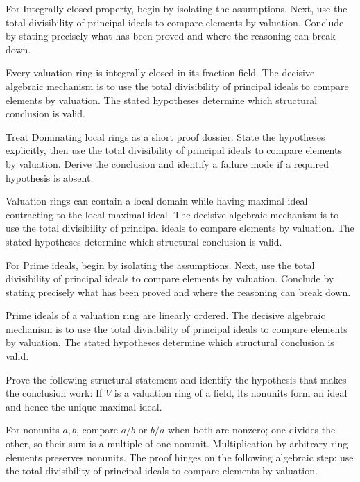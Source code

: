 \begin{problem}\label{prob:v21-problem-06}
For Integrally closed property, begin by isolating the assumptions. Next, use the total divisibility of principal ideals to compare elements by valuation. Conclude by stating precisely what has been proved and where the reasoning can break down.
\end{problem}
\begin{solution}
Every valuation ring is integrally closed in its fraction field. The decisive algebraic mechanism is to use the total divisibility of principal ideals to compare elements by valuation. The stated hypotheses determine which structural conclusion is valid.
\end{solution}

\begin{problem}\label{prob:v21-problem-07}
Treat Dominating local rings as a short proof dossier. State the hypotheses explicitly, then use the total divisibility of principal ideals to compare elements by valuation. Derive the conclusion and identify a failure mode if a required hypothesis is absent.
\end{problem}
\begin{solution}
Valuation rings can contain a local domain while having maximal ideal contracting to the local maximal ideal. The decisive algebraic mechanism is to use the total divisibility of principal ideals to compare elements by valuation. The stated hypotheses determine which structural conclusion is valid.
\end{solution}

\begin{problem}\label{prob:v21-problem-08}
For Prime ideals, begin by isolating the assumptions. Next, use the total divisibility of principal ideals to compare elements by valuation. Conclude by stating precisely what has been proved and where the reasoning can break down.
\end{problem}
\begin{solution}
Prime ideals of a valuation ring are linearly ordered. The decisive algebraic mechanism is to use the total divisibility of principal ideals to compare elements by valuation. The stated hypotheses determine which structural conclusion is valid.
\end{solution}

\begin{problem}\label{prob:v21-problem-09}
Prove the following structural statement and identify the hypothesis that makes the conclusion work: If $V$ is a valuation ring of a field, its nonunits form an ideal and hence the unique maximal ideal.
\end{problem}
\begin{solution}
For nonunits $a,b$, compare $a/b$ or $b/a$ when both are nonzero; one divides the other, so their sum is a multiple of one nonunit. Multiplication by arbitrary ring elements preserves nonunits. The proof hinges on the following algebraic step: use the total divisibility of principal ideals to compare elements by valuation.
\end{solution}

